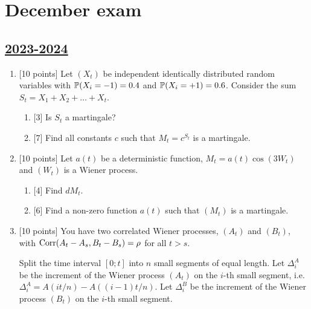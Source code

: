 


\newpage
\thispagestyle{empty}
\section{December exam}


\subsection[2023-2024]{\hyperref[sec:sol_kr_02_2023_2024]{2023-2024}}
\label{sec:kr_02_2023_2024} %

\begin{enumerate}
    \item {[10 points]} Let $(X_t)$ be independent identically distributed random variables 
    with $\P(X_i = -1) = 0.4$ and $\P(X_i = +1) = 0.6$. Consider the sum $S_t = X_1 + X_2 + \ldots + X_t$.
 \begin{enumerate}
    \item {[3]} Is $S_t$ a martingale?
    \item {[7]} Find all constants $c$ such that $M_t = c^{S_t}$ is a martingale. 
 \end{enumerate}

\item {[10 points]} Let $a(t)$ be a deterministic function, $M_t = a(t) \cos (3W_t)$ and $(W_t)$ is a Wiener process.

\begin{enumerate}
    \item {[4]} Find $dM_t$. 
    \item {[6]} Find a non-zero function $a(t)$ such that $(M_t)$ is a martingale.
\end{enumerate}
 
\item {[10 points]} You have two correlated Wiener processes, $(A_t)$ and $(B_t)$, with $\Corr(A_t - A_s, B_t - B_s) = \rho$ for all $t > s$.

Split the time interval $[0;t]$ into $n$ small segments of equal length. 
Let $\Delta^A_i$ be the increment of the Wiener process $(A_t)$ on the $i$-th small segment, i.e. $\Delta^A_i = A(it/n) - A((i-1)t/n)$.
Let $\Delta^B_i$ be the increment of the Wiener process $(B_t)$ on the $i$-th small segment.


\end{enumerate}
